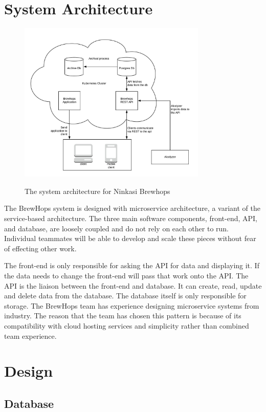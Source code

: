 \section{System Architecture}
\begin{figure}[H]
    \centering
    \caption{The system architecture for Ninkasi Brewhops}
    \includegraphics[origin=c,width=0.8\textwidth,keepaspectratio]{./diagrams/brewhops-architecture.jpeg}
    \label{System Architecture}
\end{figure}

The BrewHops system is designed with microservice architecture, a variant of the service-based architecture. The three main software components, front-end, API, and database, are loosely coupled and do not rely on each other to run. Individual teammates will be able to develop and scale these pieces without fear of effecting other work.

The front-end is only responsible for asking the API for data and displaying it. If the data needs to change the front-end will pass that work onto the API. The API is the liaison between the front-end and database. It can create, read, update and delete data from the database. The database itself is only responsible for storage. The BrewHops team has experience designing microservice systems from industry. The reason that the team has chosen this pattern is because of its compatibility with cloud hosting services and simplicity rather than combined team experience. 
\section{Design}

    \subsection{Database}
    
